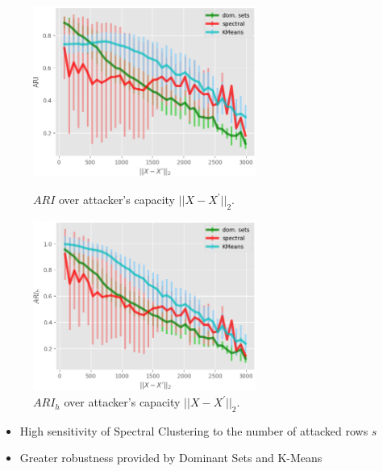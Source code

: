 \documentclass{beamer}
\begin{document}
\begin{frame}
	\begin{figure}[H]
	\begin{minipage}[t]{0.45\linewidth}
		\centering
		\includegraphics[width=0.65\textwidth]{img/advrows/X2_ARI.png}
		\caption{\footnotesize $ARI$ over attacker's capacity $\vert \vert X - X^\prime\vert \vert_2$.}
	\end{minipage}        
	\hspace{.1cm}
	\begin{minipage}[t]{0.45\linewidth}
		\centering
		\includegraphics[width=0.65\textwidth]{img/advrows/X2_ARIh.png}
		\caption{\footnotesize $ARI_h$ over attacker's capacity $\vert \vert X - X^\prime\vert \vert_2$.}
	\end{minipage}
\end{figure}
   	\changefontsizes{7.8pt}
\begin{itemize}
	\item High sensitivity of Spectral Clustering to the number of attacked rows $s$
	\item Greater robustness provided by Dominant Sets and K-Means
\end{itemize}
\end{frame}
\end{document}
